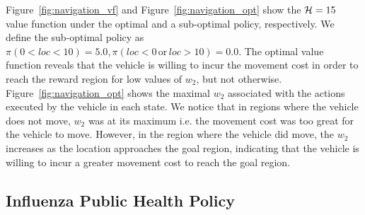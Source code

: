 Figure~\ref{fig:navigation_vf} and Figure~\ref{fig:navigation_opt} show the {\footnotesize$ \mathcal{H} = 15 $} value function under the optimal and a sub-optimal policy, respectively. We define the sub-optimal policy as $ \pi(0 < loc < 10) = 5.0,  \pi(loc < 0 \,\mathrm{or}\, loc > 10) = 0.0$. The optimal value function reveals that the vehicle is willing to incur the movement cost in order to reach the reward region for low values of {\footnotesize $ w_2 $}, but not otherwise. Figure~\ref{fig:navigation_opt} shows the maximal {\footnotesize $ w_2 $} associated with the actions executed by the vehicle in each state. We notice that in regions where the vehicle does not move, {\footnotesize $ w_2 $} was at its maximum i.e. the movement cost was too great for the vehicle to move. However, in the region where the vehicle did move, the {\footnotesize $ w_2 $} increases as the location approaches the goal region, indicating that the vehicle is willing to incur a greater movement cost to reach the goal region.


\subsection{Influenza Public Health Policy}
\label{sec:results_influenza}

